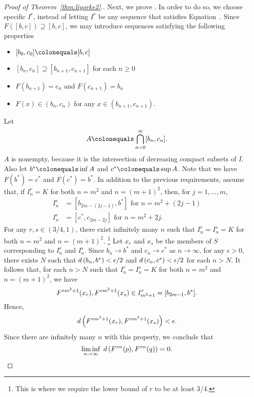 \documentclass[12pt,draft,twoside]{book}
\begin{document}
\begin{proof}[Proof of Theorem~\ref{thm:liyorke2}.]
  Next, we prove .
  In order to do so, we choose specific $I^r$, instead of letting $I^r$ be any sequence that satisfies Equation~.
  Since $F([b,c]) \supseteq [b,c]$, we may introduce sequences satisfying the following properties
  \begin{itemize}
    \item $[b_0, c_0] \ceq [b,c]$
    \item $[b_n, c_n] \supseteq [b_{n+1}, c_{n+1}]$ for each $n \geq 0$
    \item $F(b_{n+1}) = c_n$ and $F(c_{n+1}) = b_n$
    \item $F(x) \in (b_n, c_n)$ for any $x \in (b_{n+1}, c_{n+1})$.
  \end{itemize}
  Let
  \begin{equation*}
    A \ceq \bigcap\limits_{n=0}^{\infty} [b_n, c_n].
  \end{equation*}
  $A$ is nonempty, because it is the intersection of decreasing compact subsets of $I$.
  Also let $b^* \ceq \inf A$ and $c^* \ceq \sup A$.
  Note that we have $F(b^*) = c^*$ and $F(c^*) = b^*$.
  In addition to the previous requirements, assume that, if $I_n^r = K$ for both $n = m^2$ and $n = (m+1)^2$, then, for $j = 1, \ldots, m$, 
  \begin{align*}
    I_n^r &= [b_{2m - (2j - 1)}, b^*] \mbox{ for } n = m^2 + (2j - 1)  \\
    I_n^r &= [c^*, c_{2m - 2j}] \mbox{ for } n = m^2 + 2j.
  \end{align*}
  For any $r, s \in (3/4, 1)$, there exist infinitely many $n$ such that $I_n^r = I_n^s = K$ for both $n = m^2$ and $n = (m+1)^2$. \footnote{This is where we require the lower bound of $r$ to be at least 3/4.}
  Let $x_r$ and $x_s$ be the members of $S$ corresponding to $I_n^r$ and $I_n^s$.
  Since $b_n \to b^*$ and $c_n \to c^*$ as $n \to \infty$, for any $\epsilon > 0$, there exists $N$ such that $d\left( b_n, b^* \right) < \epsilon/2$ and $d\left( c_n, c^* \right) < \epsilon/2$ for each $n > N$.
  It follows that, for each $n > N$ such that $I_n^r = I_n^s = K$ for both $n = m^2$ and $n = (m+1)^2$, we have 
  \begin{equation*}
    F^{\circ m^2 + 1}(x_r), F^{\circ m^2 + 1}(x_s) \in I_{m^2 + 1}^r = [b_{2m - 1}, b^*].
  \end{equation*}
  Hence, 
  \begin{equation*}
    d\left( F^{\circ m^2 + 1}(x_r), F^{\circ m^2 + 1}(x_s) \right) < \epsilon.
  \end{equation*}
  Since there are infinitely many $n$ with this property, we conclude that 
  \begin{equation*}
    \liminf\limits_{n \to \infty}\; d\left( F^{\circ n}(p) , F^{\circ n}(q) \right) = 0.
  \end{equation*}
\end{proof}
\end{document}
